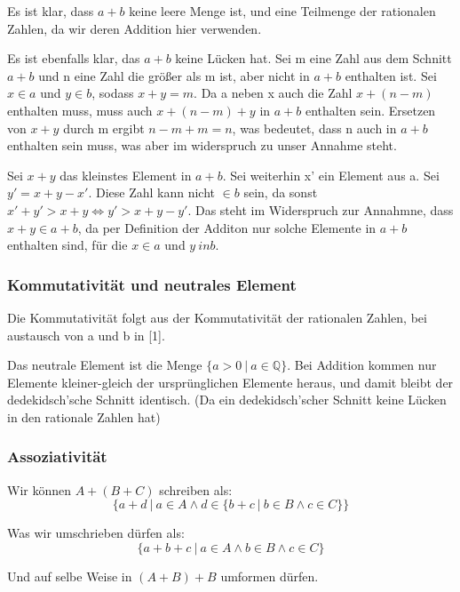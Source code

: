 \documentclass[12pt]{article}
\begin{document}
    Es ist klar, dass $a + b$ keine leere Menge ist, und eine Teilmenge der rationalen Zahlen, da wir deren Addition
    hier verwenden.

    Es ist ebenfalls klar, das $a + b$ keine Lücken hat.
    Sei m eine Zahl aus dem Schnitt $a + b$ und n eine Zahl die größer als m ist, aber nicht in $a + b$ enthalten ist.
    Sei $x \in a$ und $y \in b$, sodass $x + y = m$. Da a neben x auch die Zahl $x + (n - m)$ enthalten muss,
    muss auch $x + (n - m) + y$ in $a + b$ enthalten sein. Ersetzen von $x + y$ durch m ergibt $n - m + m = n$,
    was bedeutet, dass n auch in $a + b$ enthalten sein muss, was aber im widerspruch zu unser Annahme steht.

    Sei $x + y$ das kleinstes Element in $a + b$. Sei weiterhin x' ein Element aus a.
    Sei $y' = x + y - x'$. Diese Zahl kann nicht $\in b$ sein, da sonst $x' + y' > x + y \Leftrightarrow y' > x + y - y'$.
    Das steht im Widerspruch zur Annahmne, dass $x + y \in a + b$, da per Definition der Additon nur solche Elemente
    in $a + b$ enthalten sind, für die $x \in a$ und $y \ in b$.

    \subsubsection{Kommutativität und neutrales Element}

    Die Kommutativität folgt aus der Kommutativität der rationalen Zahlen, bei austausch von a und b in [1].

    Das neutrale Element ist die Menge $\{a > 0 \mspace{4mu} | \mspace{4mu} a \in \mathbb{Q}\}$.
    Bei Addition kommen nur Elemente kleiner-gleich der ursprünglichen Elemente heraus, und damit bleibt
    der dedekidsch'sche Schnitt identisch.
    (Da ein dedekidsch'scher Schnitt keine Lücken in den rationale Zahlen hat)

    \subsubsection{Assoziativität}

    Wir können $A + (B + C)$ schreiben als:
    \[\{a+d \mspace{4mu} | \mspace{4mu} a \in A \land d \in \{b + c \mspace{4mu} | \mspace{4mu} b \in B \land c \in C\}\}\]

    Was wir umschrieben dürfen als:
    \[\{a+b+c \mspace{4mu} | \mspace{4mu} a \in A \land b \in B \land c \in C\}\]

    Und auf selbe Weise in $(A + B) + B$ umformen dürfen.
\end{document}
